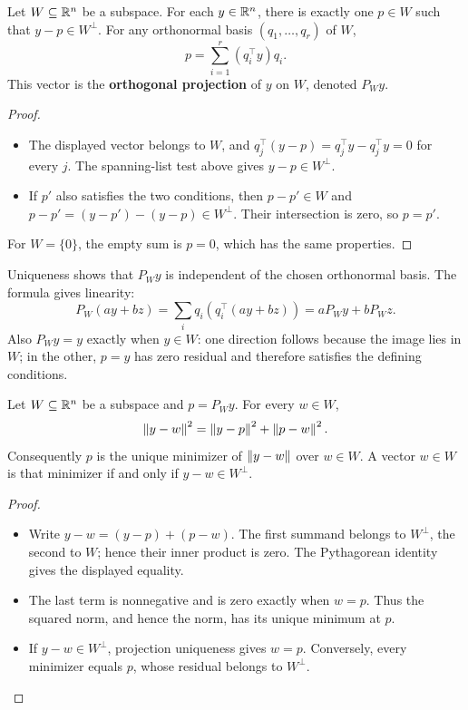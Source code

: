 \begin{theorem}\label{thm:06:projection}
Let \(W\subseteq\mathbb R^n\) be a subspace. For each \(y\in\mathbb R^n\),
there is exactly one \(p\in W\) such that
\(y-p\in W^\perp\). For any orthonormal basis \((q_1,\ldots,q_r)\) of \(W\),
\[
p=\sum_{i=1}^r(q_i^\top y)q_i.
\]
This vector is the \textbf{orthogonal projection} of \(y\) on \(W\),
denoted \(P_W y\).
\end{theorem}
\begin{proof}
\begin{itemize}
\item The displayed vector belongs to \(W\), and
  \(q_j^\top(y-p)=q_j^\top y-q_j^\top y=0\) for every \(j\).
  The spanning-list test above gives \(y-p\in W^\perp\).
\item If \(p'\) also satisfies the two conditions, then
  \(p-p'\in W\) and \(p-p'=(y-p')-(y-p)\in W^\perp\).
  Their intersection is zero, so \(p=p'\).
\end{itemize}
For \(W=\{0\}\), the empty sum is \(p=0\), which has the same properties.
\end{proof}

Uniqueness shows that \(P_Wy\)
is independent of the chosen orthonormal basis. The formula gives linearity:
\[
P_W(ay+bz)=\sum_i q_i(q_i^\top(ay+bz))=aP_Wy+bP_Wz.
\]
Also \(P_Wy=y\) exactly when \(y\in W\): one direction follows because
the image lies in \(W\); in the other, \(p=y\) has zero residual and
therefore satisfies the defining conditions.

\begin{theorem}\label{thm:06:closest}
Let \(W\subseteq\mathbb R^n\) be a subspace and \(p=P_Wy\).
For every \(w\in W\),
\[
\left\lVert y-w\right\rVert^2=\left\lVert y-p\right\rVert^2+\left\lVert p-w\right\rVert^2.
\]
Consequently \(p\) is the unique minimizer of \(\left\lVert y-w\right\rVert\) over \(w\in W\).
A vector \(w\in W\) is that minimizer if and only if \(y-w\in W^\perp\).
\end{theorem}
\begin{proof}
\begin{itemize}
\item Write \(y-w=(y-p)+(p-w)\). The first summand belongs to
  \(W^\perp\), the second to \(W\); hence their inner product is zero.
  The Pythagorean identity gives the displayed equality.
\item The last term is nonnegative and is zero exactly when \(w=p\).
  Thus the squared norm, and hence the norm, has its unique minimum at \(p\).
\item If \(y-w\in W^\perp\), projection uniqueness gives \(w=p\).
  Conversely, every minimizer equals \(p\), whose residual belongs to \(W^\perp\).
\end{itemize}
\end{proof}

